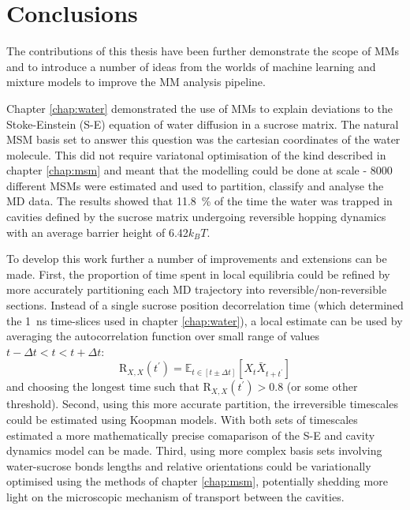 \let\textcircled=\pgftextcircled
\chapter{Conclusions}
\label{chap:conclusions}


The contributions of this thesis have been further demonstrate the scope of MMs and to introduce a number of ideas from the worlds of machine learning and mixture models to improve the MM analysis pipeline. 

Chapter \ref{chap:water} demonstrated the use of MMs to explain deviations to the Stoke-Einstein (S-E) equation of water diffusion in a sucrose matrix. The natural MSM basis set to answer this question was the cartesian coordinates of the water molecule. This did not require variatonal optimisation of the kind described in chapter \ref{chap:msm} and meant that the modelling could be done at scale - 8000 different MSMs were estimated and used to partition, classify and analyse the MD data. The results showed that \SI{11.8}{\percent} of the time the water was trapped in cavities defined by the sucrose matrix undergoing reversible hopping dynamics with an average barrier height of \num{6.42}$k_{B}T$. 

To develop this work further a number of improvements and extensions can be made. First, the proportion of time spent in local equilibria could be refined by more accurately partitioning each MD trajectory into reversible/non-reversible sections. Instead of a single sucrose position decorrelation time (which determined the \SI{1}{\nano\second} time-slices used in chapter \ref{chap:water}), a local estimate can be used by averaging the autocorrelation function over small range of values $t-\Delta t < t < t+\Delta t$:
\begin{equation}
\mathrm{R}_{X,  X}(t^{\prime})=\mathbb{E}_{t \in [t\pm\Delta t]}\left[X_{t} \bar{X}_{t+t^{\prime}}\right]
\end{equation}
and choosing the longest time such that $\mathrm{R}_{X,  X}(t^{\prime}) > 0.8$ (or some other threshold). Second, using this more accurate partition, the irreversible timescales could be estimated using Koopman models\cite{wuVariationalKoopmanModels2017}. With both sets of timescales estimated a more mathematically precise comaparison of the S-E and cavity dynamics model can be made. Third, using more complex basis sets involving water-sucrose bonds lengths and relative orientations could be  variationally  optimised using the methods of chapter \ref{chap:msm}, potentially shedding more light on the microscopic mechanism of transport between the cavities. 

